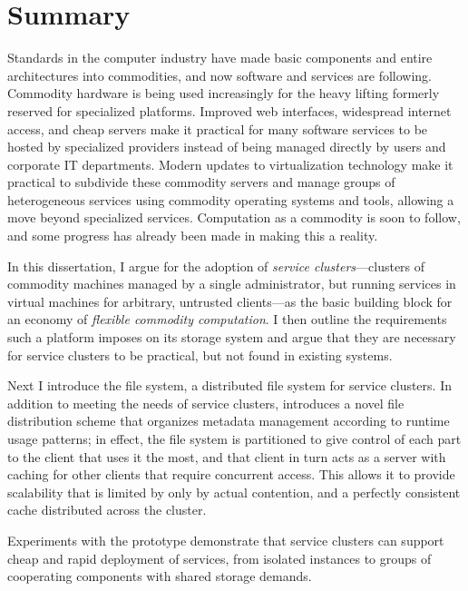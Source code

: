 \chapter*{Summary}

Standards in the computer industry have made basic components and entire architectures into commodities, and now software and services are following. Commodity hardware is being used increasingly for the heavy lifting formerly reserved for specialized platforms. Improved web interfaces, widespread internet access, and cheap servers make it practical for many software services to be hosted by specialized providers instead of being managed directly by users and corporate IT departments. Modern updates to virtualization technology make it practical to subdivide these commodity servers and manage groups of heterogeneous services using commodity operating systems and tools, allowing a move beyond specialized services. Computation as a commodity is soon to follow, and some progress has already been made in making this a reality.

In this dissertation, I argue for the adoption of \emph{service clusters}---clusters of commodity machines managed by a single administrator, but running services in virtual machines for arbitrary, untrusted clients---as the basic building block for an economy of \emph{flexible commodity computation}. I then outline the requirements such a platform imposes on its storage system and argue that they are necessary for service clusters to be practical, but not found in existing systems.

Next I introduce the \envoy file system, a distributed file system for service clusters. In addition to meeting the needs of service clusters, \envoy introduces a novel file distribution scheme that organizes metadata management according to runtime usage patterns; in effect, the file system is partitioned to give control of each part to the client that uses it the most, and that client in turn acts as a server with caching for other clients that require concurrent access. This allows it to provide scalability that is limited by only by actual contention, and a perfectly consistent cache distributed across the cluster.

Experiments with the \envoy prototype demonstrate that service clusters can support cheap and rapid deployment of services, from isolated instances to groups of cooperating components with shared storage demands.